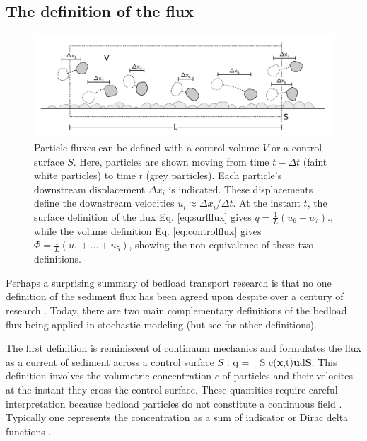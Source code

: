\subsection{The definition of the flux}
\begin{figure}[!htbp]
	\includegraphics[width=\linewidth,keepaspectratio]{./figures/ch1/fluxDefinitions.png}
	\caption{Particle fluxes can be defined with a control volume $V$ or a control surface $S$. Here, particles are shown moving from time $t-\Delta t$ (faint white particles) to time $t$ (grey particles). Each particle's downstream displacement $\Delta x_i$ is indicated. These displacements define the downstream velocities $u_i \approx \Delta x_i/\Delta t.$ At the instant $t$, the surface definition of the flux Eq. \ref{eq:surfflux} gives $q = \frac{1}{L}(u_6+u_7).$, while the volume definition Eq. \ref{eq:controlflux} gives $\Phi = \frac{1}{L}(u_1+\dots+u_5)$,
	showing the non-equivalence of these two definitions.}
	\label{fig:fluxdefs}
\end{figure}
Perhaps a surprising summary of bedload transport research is that no one definition of the sediment flux has been agreed upon despite over a century of research \citep{Ballio2018}.
Today, there are two main complementary definitions of the bedload flux being applied in stochastic modeling (but see \citet{Ballio2014,Ballio2018} for other definitions).

The first definition is reminiscent of continuum mechanics and formulates the flux as a current of sediment across a control surface $S$ \citep{Furbish2012,Heyman2016,Ballio2014}: 
\be q = \int_S c(\textbf{x},t)\textbf{u}\cdot d\textbf{S}. \label{eq:surfflux} \ee
This definition involves the volumetric concentration $c$ of particles and their velocites at the instant they cross the control surface. These quantities require careful interpretation because bedload particles do not constitute a continuous field \citep{Furbish2012a}. Typically one represents the concentration as a sum of indicator or Dirac delta functions \citep[cf.][Sec. 8.5.1]{Gardiner1983}.

